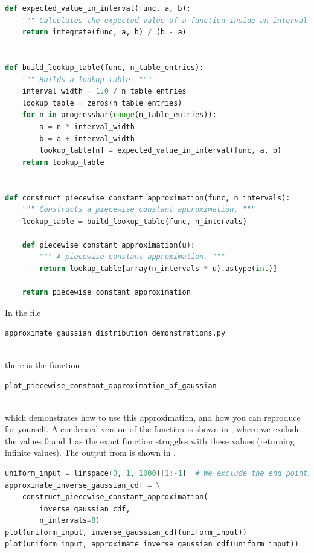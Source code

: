 \documentclass[11pt,a4paper,oneside,english]{extarticle}
\newcommand{\singlecodeline}[1]{\\[1em]\centerline{\lstinline[basicstyle=\ttfamily]$#1$}\\[1em]}
\begin{document}
\begin{lstfloat}[htb]
\begin{lstlisting}[language=python, captionpos=b, caption={Constructing a piecewise constant approximation.}, label={code:python:construct_piecewise_constant_approximation}]
def expected_value_in_interval(func, a, b):
    """ Calculates the expected value of a function inside an interval. """
    return integrate(func, a, b) / (b - a)


def build_lookup_table(func, n_table_entries):
    """ Builds a lookup table. """
    interval_width = 1.0 / n_table_entries
    lookup_table = zeros(n_table_entries)
    for n in progressbar(range(n_table_entries)):
        a = n * interval_width
        b = a + interval_width
        lookup_table[n] = expected_value_in_interval(func, a, b)
    return lookup_table


def construct_piecewise_constant_approximation(func, n_intervals):
    """ Constructs a piecewise constant approximation. """
    lookup_table = build_lookup_table(func, n_intervals)

    def piecewise_constant_approximation(u):
        """ A piecewise constant approximation. """
        return lookup_table[array(n_intervals * u).astype(int)]

    return piecewise_constant_approximation
\end{lstlisting}
\end{lstfloat}

In the file \singlecodeline{approximate_gaussian_distribution_demonstrations.py}
there is the function  
\singlecodeline{plot_piecewise_constant_approximation_of_gaussian}
which demonstrates how to use this approximation, and how you can reproduce  for yourself. A condensed version of the function is shown in , where we exclude the values 0 and 1 as the exact function struggles with these values (returning infinite values). The output from  is shown in .

\begin{lstfloat}[htb]
\begin{lstlisting}[language=python, captionpos=b, caption={Comparing the exact and approximate functions.}, label={code:python:plot_piecewise_constant_approximation_of_gaussian}]
uniform_input = linspace(0, 1, 1000)[1:-1]  # We exclude the end points.
approximate_inverse_gaussian_cdf = \
    construct_piecewise_constant_approximation(
        inverse_gaussian_cdf, 
        n_intervals=8)
plot(uniform_input, inverse_gaussian_cdf(uniform_input))
plot(uniform_input, approximate_inverse_gaussian_cdf(uniform_input))
\end{lstlisting}
\end{lstfloat}
\end{document}
